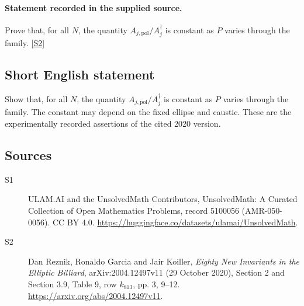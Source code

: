 \documentclass[11pt]{article}
\newcommand{\sref}[2]{\hyperlink{source:#1:#2}{[S#2]}}
\begin{document}
\paragraph{Statement recorded in the supplied source.}
Prove that, for all $N$, the quantity $A_{j,\mathrm{pol}}/A_j^\dagger$ is constant as $P$ varies through the family. \sref{5100056}{2}
\subsection{Short English statement}
Show that, for all $N$, the quantity $A_{j,\mathrm{pol}}/A_j^\dagger$ is constant as $P$ varies through the family. The constant may depend on the fixed ellipse and caustic. These are the experimentally recorded assertions of the cited 2020 version.
\subsection{Sources}
\begin{description}
\item[\hypertarget{source:5100056:1}{S1}] ULAM.AI and the UnsolvedMath Contributors, UnsolvedMath: A Curated Collection of Open Mathematics Problems, record 5100056 (AMR-050-0056). CC BY 4.0. \url{https://huggingface.co/datasets/ulamai/UnsolvedMath}.
\item[\hypertarget{source:5100056:2}{S2}] Dan Reznik, Ronaldo Garcia and Jair Koiller, \emph{Eighty New Invariants in the Elliptic Billiard}, arXiv:2004.12497v11 (29 October 2020), Section 2 and Section 3.9, Table 9, row $k_{813}$, pp. 3, 9--12. \url{https://arxiv.org/abs/2004.12497v11}.
\end{description}
\label{end:5100056}
\end{document}
